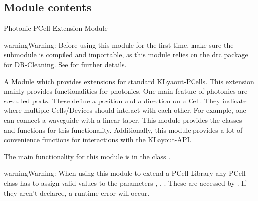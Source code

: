 \documentclass[a4paper,10pt,english]{sphinxmanual}
\begin{document}
\subsection{Module contents}
\label{\detokenize{photonics:module-photonics}}\label{\detokenize{photonics:module-contents}}
Photonic PCell-Extension Module

\begin{sphinxadmonition}{warning}{Warning:}
Before using this module for the first time, make sure the  submodule is compiled and importable, as this  module
relies on the drc package for DR-Cleaning. See {\hyperref[\detokenize{drc:module-drc}]{}} for further details.
\end{sphinxadmonition}

A Module which provides extensions for standard KLyaout-PCells. This extension mainly provides functionalities for
photonics. One main feature of photonics are so-called ports. These define a position and a direction on a Cell.
They indicate where multiple Cells/Devices should interact with each other. For example, one can connect a waveguide
with a linear taper. This module provides the classes and functions for this functionality. Additionally, this module
provides a lot of convenience functions for interactions with the KLayout-API.

The main functionality for this module is in the class {\hyperref[\detokenize{photonics:photonics.PhotDevice}]{}}.

\begin{sphinxadmonition}{warning}{Warning:}
When using this module to extend a PCell-Library any PCell class has to assign valid values to the
parameters  ,  ,  . These are accessed by {\hyperref[\detokenize{photonics:photonics.PhotDevice}]{}}. If they
aren’t declared, a runtime error will occur.
\end{sphinxadmonition}
\end{document}
